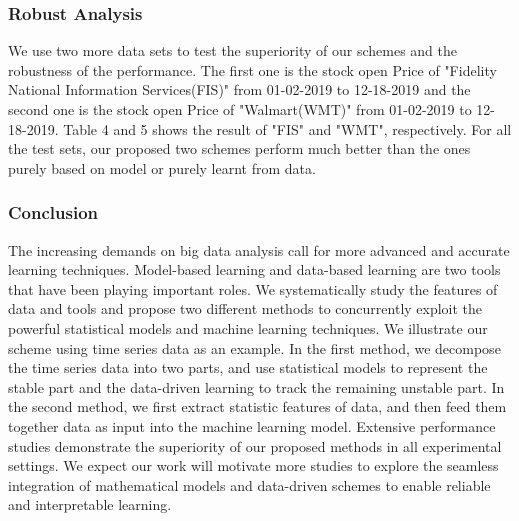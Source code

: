 



\subsubsection{Robust Analysis}
We use two more data sets to test the superiority of our schemes and the robustness of the performance. The first one is the stock open Price of "Fidelity National Information Services(FIS)" from 01-02-2019 to 12-18-2019 and the second one is the stock open Price of "Walmart(WMT)" from 01-02-2019 to 12-18-2019. %
Table 4 and 5 shows the result of "FIS" and "WMT", respectively.  %
For all the test sets, our proposed two schemes perform much better than the ones purely based on model or purely learnt from data.  

\subsubsection{Conclusion}
The increasing demands on big data analysis call for more advanced and accurate learning techniques. Model-based learning and data-based learning are two tools that have been playing important roles. We systematically study the features of data and tools and propose two different methods to concurrently exploit the powerful statistical models and machine learning techniques. We illustrate our scheme using time series data as an example. In the first method, we decompose the time series data into two parts, and use statistical models to represent the stable part and the data-driven learning to track the remaining unstable part. In the second method, we first extract statistic features of data, and then feed them together data as input into the machine learning model. Extensive performance studies demonstrate the superiority of our proposed methods in all experimental settings.  We expect our work will motivate more studies to explore the seamless integration of mathematical models and data-driven schemes to enable reliable and interpretable learning.      
 
